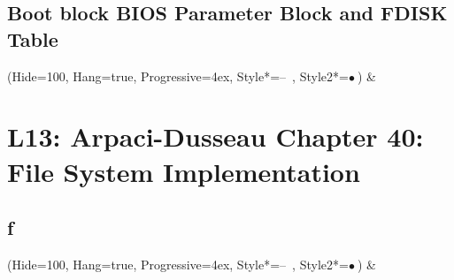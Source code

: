 \documentclass[11pt, oneside]{article}
\begin{document}
\subsection{Boot block BIOS Parameter Block and FDISK Table}
    \begin{easylist}  
    \ListProperties(Hide=100, Hang=true, Progressive=4ex, Style*=--\ , Style2*=$\bullet\ $)
        & 
    \end{easylist}
\clearpage

\section{L13: Arpaci-Dusseau Chapter 40: File System Implementation}
\subsection{f}
    \begin{easylist}  
    \ListProperties(Hide=100, Hang=true, Progressive=4ex, Style*=--\ , Style2*=$\bullet\ $)
        & 
    \end{easylist}
\clearpage
\end{document}
